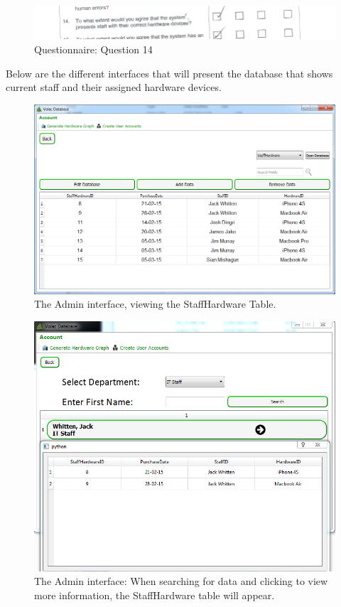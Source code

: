 \begin{figure}[H]
    \includegraphics[width=\textwidth]{./Evaluation/EvaluationQuestionnaire/14.png}
    \caption{Questionnaire: Question 14} 
\end{figure}

Below are the different interfaces that will present the database that shows current staff and their assigned hardware devices.

\begin{figure}[H]
    \includegraphics[width=\textwidth]{./Evaluation/Images/Database1.png}
    \caption{The Admin interface, viewing the StaffHardware Table.} \label{fig:db1}
\end{figure}

\begin{figure}[H]
    \includegraphics[width=\textwidth]{./Evaluation/Images/database3.png}
    \caption{The Admin interface: When searching for data and clicking to view more information, the StaffHardware table will appear.} \label{fig:db2}
\end{figure}


